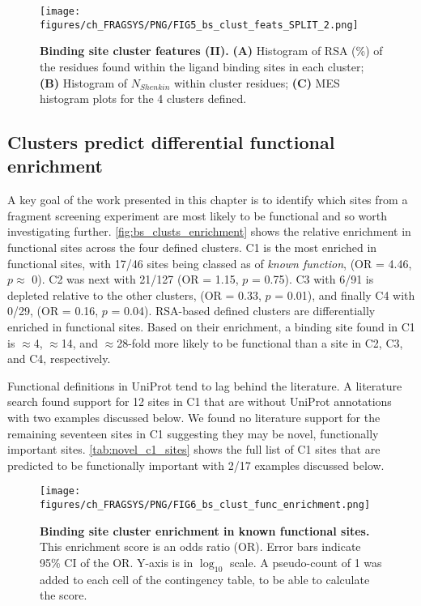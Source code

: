 \begin{figure}[htb!]
    \centering
    \texttt{[image: figures/ch\_FRAGSYS/PNG/FIG5\_bs\_clust\_feats\_SPLIT\_2.png]}
    \caption[Binding site cluster features (II)]{\textbf{Binding site cluster features (II).} \textbf{(A)} Histogram of RSA (\%) of the residues found within the ligand binding sites in each cluster; \textbf{(B)} Histogram of $N_{Shenkin}$ within cluster residues; \textbf{(C)} MES histogram plots for the 4 clusters defined.}
    \label{fig:bs_clusts_feats_2}
\end{figure}

\subsection{Clusters predict differential functional enrichment}

A key goal of the work presented in this chapter is to identify which sites from a fragment screening experiment are most likely to be functional and so worth investigating further. \autoref{fig:bs_clusts_enrichment} shows the relative enrichment in functional sites across the four defined clusters. C1 is the most enriched in functional sites, with 17/46 sites being classed as of \textit{known function}, (OR = 4.46, $p \approx$ 0). C2 was next with 21/127 (OR = 1.15, $p$ = 0.75). C3 with 6/91 is depleted relative to the other clusters, (OR = 0.33, $p$ = 0.01), and finally C4 with 0/29, (OR = 0.16, $p$ = 0.04). RSA-based defined clusters are differentially enriched in functional sites. Based on their enrichment, a binding site found in C1 is $\approx$4, $\approx$14, and $\approx$28-fold more likely to be functional than a site in C2, C3, and C4, respectively.

Functional definitions in UniProt tend to lag behind the literature. A literature search found support for 12 sites in C1 that are without UniProt annotations with two examples discussed below. We found no literature support for the remaining seventeen sites in C1 suggesting they may be novel, functionally important sites.  \autoref{tab:novel_c1_sites} shows the full list of C1 sites that are predicted to be functionally important with 2/17 examples discussed below.

\begin{figure}[htb!]
    \centering
    \texttt{[image: figures/ch\_FRAGSYS/PNG/FIG6\_bs\_clust\_func\_enrichment.png]}
    \caption[Binding site cluster enrichment in known functional sites]{\textbf{Binding site cluster enrichment in known functional sites.} This enrichment score is an odds ratio (OR). Error bars indicate 95\% CI of the OR. Y-axis is in $\log_{10}$ scale. A pseudo-count of 1 was added to each cell of the contingency table, to be able to calculate the score.}
    \label{fig:bs_clusts_enrichment}
\end{figure}

